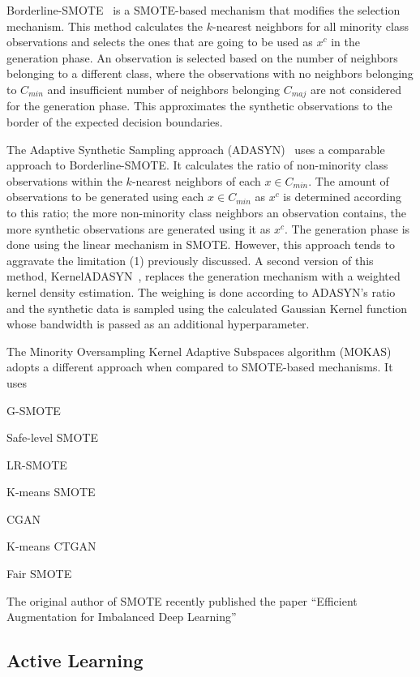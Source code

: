 \documentclass[parskip=full]{scrartcl}
\begin{document}
Borderline-SMOTE~\cite{han2005borderline} is a SMOTE-based mechanism that
modifies the selection mechanism. This method calculates the $k$-nearest
neighbors for all minority class observations and selects the ones that are
going to be used as $x^c$ in the generation phase. An observation is selected
based on the number of neighbors belonging to a different class, where the
observations with no neighbors belonging to $C_{min}$ and insufficient number
of neighbors belonging $C_{maj}$ are not considered for the generation phase.
This approximates the synthetic observations to the border of the expected
decision boundaries.

The Adaptive Synthetic Sampling approach (ADASYN)~\cite{he2008adasyn} uses a
comparable approach to Borderline-SMOTE\@. It calculates the ratio of
non-minority class observations within the $k$-nearest neighbors of each $x
\in C_{min}$. The amount of observations to be generated using each $x \in
C_{min}$ as $x^c$ is determined according to this ratio; the more non-minority
class neighbors an observation contains, the more synthetic observations are
generated using it as $x^c$. The generation phase is done using the linear
mechanism in SMOTE\@. However, this approach tends to aggravate the limitation
(1) previously discussed. A second version of this method,
KernelADASYN~\cite{tang2015kerneladasyn}, replaces the generation mechanism
with a weighted kernel density estimation. The weighing is done according to
ADASYN's ratio and the synthetic data is sampled using the calculated Gaussian
Kernel function whose bandwidth is passed as an additional hyperparameter.

The Minority Oversampling Kernel Adaptive Subspaces algorithm
(MOKAS)~\cite{lin2017minority} adopts a different approach when compared to
SMOTE-based mechanisms. It uses 

G-SMOTE~\cite{douzas2019geometric}

Safe-level SMOTE~\cite{bunkhumpornpat2009safe}

LR-SMOTE~\cite{liang2020lr}

K-means SMOTE~\cite{douzas2018improving}

CGAN~\cite{douzas2018effective}

K-means CTGAN~\cite{an2021k}

Fair SMOTE

The original author of SMOTE recently published the paper ``Efficient Augmentation for Imbalanced Deep
Learning''~\cite{dablain2022efficient}

\subsection{Active Learning}~\label{sec:active-learning}
\end{document}
